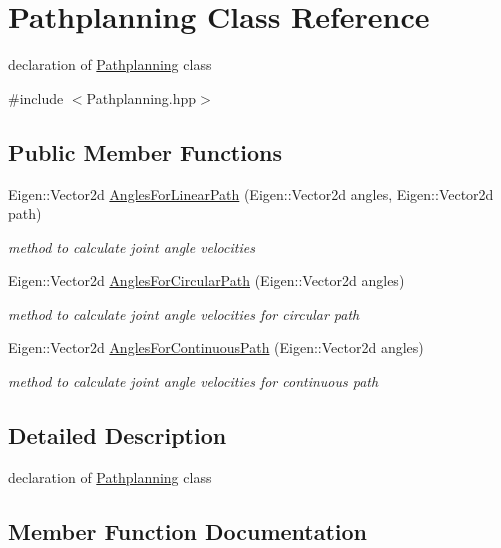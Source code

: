 \hypertarget{classPathplanning}{}\section{Pathplanning Class Reference}
\label{classPathplanning}


declaration of \hyperlink{classPathplanning}{Pathplanning} class  




{\ttfamily \#include $<$Pathplanning.\+hpp$>$}

\subsection*{Public Member Functions}
\begin{DoxyCompactItemize}
\item 
Eigen\+::\+Vector2d \hyperlink{classPathplanning_a4dda17a17352ad007d649da7264f551a}{Angles\+For\+Linear\+Path} (Eigen\+::\+Vector2d angles, Eigen\+::\+Vector2d path)
\begin{DoxyCompactList}\small\item\em method to calculate joint angle velocities \end{DoxyCompactList}\item 
Eigen\+::\+Vector2d \hyperlink{classPathplanning_a8c86c4fafd6a1857cb1a4828b2b8b10d}{Angles\+For\+Circular\+Path} (Eigen\+::\+Vector2d angles)
\begin{DoxyCompactList}\small\item\em method to calculate joint angle velocities for circular path \end{DoxyCompactList}\item 
Eigen\+::\+Vector2d \hyperlink{classPathplanning_a2f3fedddf2b7fb4a0a609b623c57e38a}{Angles\+For\+Continuous\+Path} (Eigen\+::\+Vector2d angles)
\begin{DoxyCompactList}\small\item\em method to calculate joint angle velocities for continuous path \end{DoxyCompactList}\end{DoxyCompactItemize}


\subsection{Detailed Description}
declaration of \hyperlink{classPathplanning}{Pathplanning} class 

\subsection{Member Function Documentation}
